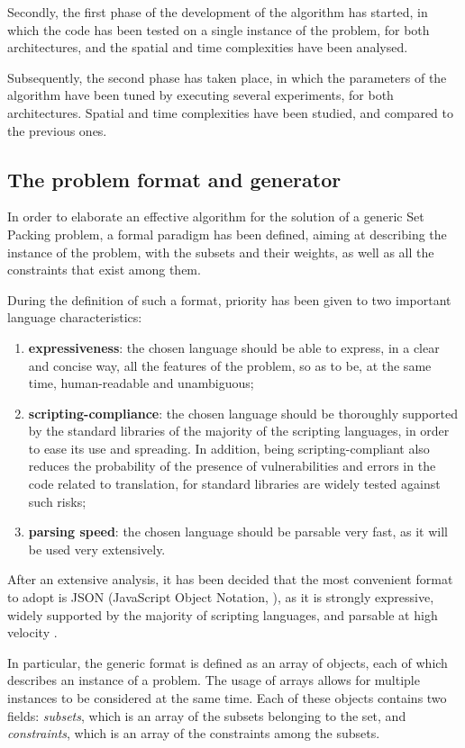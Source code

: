 \documentclass[oneside,a4paper]{article}
\begin{document}
Secondly, the first phase of the development of the algorithm has started, in which the code has been tested on a single instance of the problem, for both architectures, and the spatial and time complexities have been analysed.

Subsequently, the second phase has taken place, in which the parameters of the algorithm have been tuned by executing several experiments, for both architectures. Spatial and time complexities have been studied, and compared to the previous ones. 
\subsection{The problem format and generator}
In order to elaborate an effective algorithm for the solution of a generic Set Packing problem, a formal paradigm has been defined, aiming at describing the instance of the problem, with the subsets and their weights, as well as all the constraints that exist among them.

During the definition of such a format, priority has been given to two important language characteristics:
\begin{enumerate}
    \item \textbf{expressiveness}: the chosen language should be able to express, in a clear and concise way, all the features of the problem, so as to be, at the same time, human-readable and unambiguous;
    \item \textbf{scripting-compliance}: the chosen language should be thoroughly supported by the standard libraries of the majority of the scripting languages, in order to ease its use and spreading. In addition, being scripting-compliant also reduces the probability of the presence of vulnerabilities and errors in the code related to translation, for standard libraries are widely tested against such risks;
    \item \textbf{parsing speed}: the chosen language should be parsable very fast, as it will be used very extensively.
\end{enumerate}
After an extensive analysis, it has been decided that the most convenient format to adopt is JSON (JavaScript Object Notation, \cite{WebSite9}), as it is strongly expressive, widely supported by the majority of scripting languages, and parsable at high velocity \cite{WebSite7}.

In particular, the generic format is defined as an array of objects, each of which describes an instance of a problem. The usage of arrays allows for multiple instances to be considered at the same time. Each of these objects contains two fields: \textit{subsets}, which is an array of the subsets belonging to the set, and \textit{constraints}, which is an array of the constraints among the subsets. 
\end{document}
